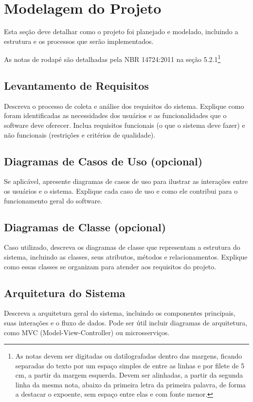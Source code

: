 \chapter{Modelagem do Projeto}

Esta seção deve detalhar como o projeto foi planejado e modelado, incluindo a estrutura e os processos que serão implementados.

As notas de rodapé são detalhadas pela NBR 14724:2011 na seção 5.2.1\footnote{As
notas devem ser digitadas ou datilografadas dentro das margens, ficando
separadas do texto por um espaço simples de entre as linhas e por filete de 5
cm, a partir da margem esquerda. Devem ser alinhadas, a partir da segunda linha
da mesma nota, abaixo da primeira letra da primeira palavra, de forma a destacar
o expoente, sem espaço entre elas e com fonte menor.}

\section{Levantamento de Requisitos}
Descreva o processo de coleta e análise dos requisitos do sistema. Explique como foram identificadas as necessidades dos usuários e as funcionalidades que o software deve oferecer. Inclua requisitos funcionais (o que o sistema deve fazer) e não funcionais (restrições e critérios de qualidade).



\section{ Diagramas de Casos de Uso (opcional)}
Se aplicável, apresente diagramas de casos de uso para ilustrar as interações entre os usuários e o sistema. Explique cada caso de uso e como ele contribui para o funcionamento geral do software.


  \section{Diagramas de Classe (opcional)}
Caso utilizado, descreva os diagramas de classe que representam a estrutura do sistema, incluindo as classes, seus atributos, métodos e relacionamentos. Explique como essas classes se organizam para atender aos requisitos do projeto.

\section{Arquitetura do Sistema}
Descreva a arquitetura geral do sistema, incluindo os componentes principais, suas interações e o fluxo de dados. Pode ser útil incluir diagramas de arquitetura, como MVC (Model-View-Controller) ou microsserviços.

